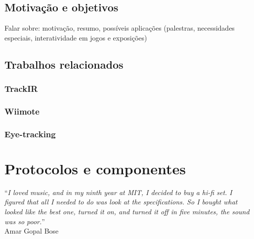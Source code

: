 \documentclass[brazil,pagestart=firstchapter]{abnt}
\begin{document}
\newpage


\section{Motivação e objetivos}
\label{sec:motivacao}

Falar sobre: motivação, resumo, possíveis aplicações (palestras,
necessidades especiais, interatividade em jogos e exposições)

\section{Trabalhos relacionados}
\label{sec:trabalhos_relacionados}

\subsection{TrackIR}
\label{sub:trackir}


\subsection{Wiimote}
\label{sub:wiimote}


\subsection{Eye-tracking}
\label{sub:eyetracking}



\chapter{Protocolos e componentes}
\label{cap:protocolos_e_componentes}


\vfill{}
\begin{flushright}{}
``\emph{I loved music, and in my ninth year at MIT, I decided to buy a hi-fi
set. I figured that all I needed to do was look at the specifications. So I
bought what looked like the best one, turned it on, and turned it off in
five minutes, the sound was so poor.}''\\
{\small Amar Gopal Bose}
\end{flushright}{\small \par}
\vfill{}
\end{document}
